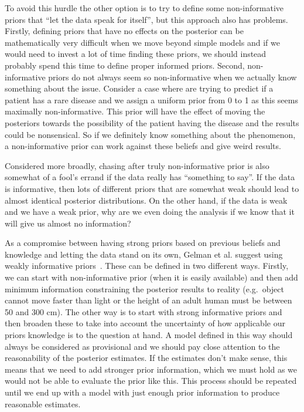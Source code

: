 \documentclass[12pt,a4paper,leqno]{report}
\theoremstyle{plain}
\theoremstyle{definition}
\theoremstyle{remark}
\begin{document}
To avoid this hurdle the other option is to try to define some non-informative
priors that ``let the data speak for itself'', but this approach also has
problems. Firstly, defining priors that have no effects on the posterior can be mathematically
very difficult when we move beyond simple models and if we would need
to invest a lot of time finding these priors, we should instead probably spend this time
to define proper informed priors. Second, non-informative priors do not always
seem so non-informative when we actually know something about the issue.
Consider a case where are trying to predict if a patient has a rare disease
and we assign a uniform prior from 0 to 1 as this seems maximally non-informative. This
prior will have the effect of moving the posteriors towards the
possibility of the patient having the disease and the results could be nonsensical. So if we definitely know
something about the phenomenon, a non-informative prior can work against these
beliefs and give weird results.\ \cite{gelman}

Considered more broadly, chasing after truly non-informative prior is also
somewhat of a fool's errand if the data really has ``something to say''.
If the data is informative, then lots of different priors that are somewhat weak
should lead to almost identical posterior distributions. On the other hand, if the data is weak and we
have a weak prior, why are we even doing the analysis if we know that it will
give us almost no information?\ \cite{gelman}

As a compromise between having strong priors based on previous beliefs and knowledge and
letting the data stand on its own, Gelman et al.
suggest using weakly informative priors\ \cite{gelman}. These can be defined in two different
ways. Firstly, we can start with non-informative prior (when it is easily
available) and then add minimum information constraining the posterior results
to reality (e.g.\ object cannot move faster than light or the height of an adult human
must be between 50 and 300 cm). The other way is to start with strong informative
priors and then broaden these to take into account the uncertainty of
how applicable our priors knowledge is to the question at hand. A model defined in this
way should always be considered as provisional and we should pay close attention to the
reasonability of the posterior estimates. If the estimates don't make sense, this means
that we need to add stronger prior information, which we must hold as we would not be
able to evaluate the prior like this. This process should be repeated until we end up with
a model with just enough prior information to produce reasonable estimates.
\end{document}
